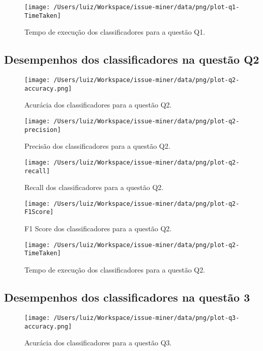 \documentclass[11pt,twoside]{article}
\begin{document}
\pagebreak
\begin{figure}[!ht]
  \centering
  \texttt{[image: /Users/luiz/Workspace/issue-miner/data/png/plot-q1-TimeTaken]}
  \caption{Tempo de execução dos classificadores para a questão Q1.}
\end{figure}

\pagebreak
\subsection{Desempenhos dos classificadores na questão Q2}
\begin{figure}[!ht]
\centering
  \texttt{[image: /Users/luiz/Workspace/issue-miner/data/png/plot-q2-accuracy.png]}
  \caption{Acurácia dos classificadores para a questão Q2.}
\end{figure}

\pagebreak
\begin{figure}[!ht]
\centering
  \texttt{[image: /Users/luiz/Workspace/issue-miner/data/png/plot-q2-precision]}
  \caption{Precisão dos classificadores para a questão Q2.}
\end{figure}

\pagebreak
\begin{figure}[!ht]
\centering
  \texttt{[image: /Users/luiz/Workspace/issue-miner/data/png/plot-q2-recall]}
  \caption{Recall dos classificadores para a questão Q2.}
\end{figure}

\pagebreak
\begin{figure}[!ht]
\centering
  \texttt{[image: /Users/luiz/Workspace/issue-miner/data/png/plot-q2-F1Score]}
  \caption{F1 Score dos classificadores para a questão Q2.}
\end{figure}

\pagebreak
\begin{figure}[!ht]
\centering
  \texttt{[image: /Users/luiz/Workspace/issue-miner/data/png/plot-q2-TimeTaken]}
  \caption{Tempo de execução dos classificadores para a questão Q2.}
\end{figure}

\pagebreak
\subsection{Desempenhos dos classificadores na questão 3}
\begin{figure}[!ht]
\centering
  \texttt{[image: /Users/luiz/Workspace/issue-miner/data/png/plot-q3-accuracy.png]}
  \caption{Acurácia dos classificadores para a questão Q3.}
\end{figure}
\end{document}
